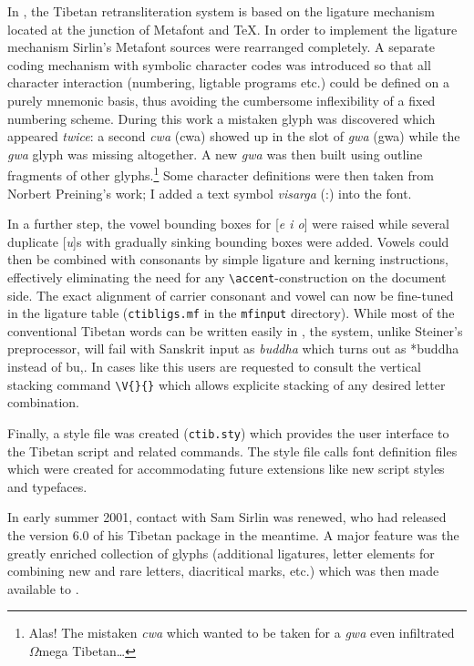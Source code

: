 \documentclass[a4paper,11pt]{article}
\begin{document}
In \TibTeX, the Tibetan retransliteration system is based on the
ligature mechanism located at the junction of Metafont and \TeX.
In order to implement the
ligature mechanism Sirlin's Metafont sources were rearranged completely.
A separate coding mechanism with symbolic character codes was introduced
so that all character interaction (numbering, ligtable programs etc.) could
be defined on a purely mnemonic basis, thus avoiding the cumbersome
inflexibility of a fixed numbering scheme. During this work a mistaken
glyph was discovered which appeared \emph{twice}: a second \emph{cwa}
({\tib cwa}) showed up in the slot of \emph{gwa} ({\tib gwa}) while
the \emph{gwa} glyph was missing altogether. A new \emph{gwa} was
then built using outline fragments of other glyphs.\footnote{%
	Alas! The mistaken \emph{cwa} which wanted to be taken for
	a \emph{gwa} even infiltrated $\Omega$mega Tibetan\dots}
Some character definitions were then taken from Norbert Preining's
work; I added a text symbol \textit{visarga} ({\tib :}) into the font.

In a further step, the vowel bounding boxes for [\emph{e i o}] were raised 
while several duplicate [\emph{u}]s with gradually sinking bounding
boxes were added. Vowels could then be combined with consonants
by simple ligature and kerning instructions, effectively eliminating
the need for any \verb-\accent--construction on the document side.
The exact alignment of carrier consonant and vowel can now be fine-tuned
in the ligature table (\verb-ctibligs.mf- in the \texttt{mfinput}
directory). While most of the conventional Tibetan words can be written
easily in \TibTeX, the system, unlike Steiner's preprocessor,
will fail with Sanskrit input as \emph{buddha} which turns out as
*{\tib buddha} instead of {\tib bu,}. In cases like this
users are requested to consult the vertical stacking command \verb|\V{}{}|
which allows explicite stacking of any desired letter combination.

Finally, a style file was created (\texttt{ctib.sty}) which provides
the user interface to the Tibetan script and related commands. The
style file calls font definition files which were created for accommodating
future extensions like new script styles and typefaces.

In early summer 2001, contact with Sam Sirlin was renewed, who had
released the version 6.0 of his Tibetan package in the meantime.
A major feature was the greatly enriched collection of glyphs
(additional ligatures, letter elements for combining new and
rare letters, diacritical marks, etc.) which was then made
available to \TibTeX.
\end{document}
